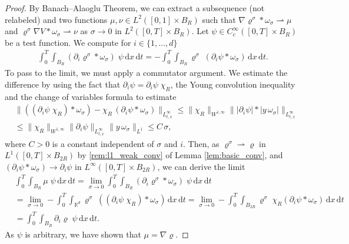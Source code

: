 \documentclass[reqno, 11pt]{amsart}
\numberwithin{equation}{section}
\theoremstyle{definition}
\begin{document}
\begin{proof}
    By Banach--Alaoglu Theorem, we can extract a subsequence (not relabeled) and two functions $\mu,\nu\in L^2([0,1]\times B_R)$ such that $\nabla\varrho^\sigma\ast\omega_\sigma \rightharpoonup \mu$ and $\varrho^\sigma\nabla V\ast\omega_\sigma \rightharpoonup \nu$ as $\sigma\rightarrow 0$ in $L^2([0,T]\times B_R)$. Let $\psi\in C_c^\infty([0,T]\times B_R)$ be a test function. We compute for $i\in \{1,\ldots,d\}$
    \begin{align*}
        \int_0^T \int_{B_R}
        (\partial_i \varrho^\sigma\ast\omega_\sigma)\;\psi\,\mathrm{d} x\,\mathrm{d} t
        =-\int_0^T \int_{B_R}
        \varrho^\sigma \; (\partial_i \psi\ast\omega_\sigma)\,\mathrm{d} x\,\mathrm{d} t.
    \end{align*}
    To pass to the limit, we must apply a commutator argument. We estimate the difference by using the fact that $\partial_i\psi=\partial_i\psi\;\chi_R$, the Young convolution inequality and the change of variables formula to estimate
    \begin{align*}
        &\|((\partial_i \psi\;\chi_R)\ast\omega_\sigma)-\chi_R\, (\partial_i \psi\ast\omega_\sigma)\|_{L_{t,x}^\infty}
        \leq \|\chi_R\|_{W^{1,\infty}}\||\partial_i \psi|\ast |y\,\omega_\sigma|\|_{L_{t,x}^\infty}\\
        &\leq \|\chi_R\|_{W^{1,\infty}}\|\partial_i \psi\|_{L_{t,x}^\infty}\|y\,\omega_\sigma\|_{L^1}
        \leq C\,\sigma,
    \end{align*}
    where $C>0$ is a constant independent of $\sigma$ and $i$. Then, as $\varrho^\sigma\rightharpoonup \varrho$ in $L^1([0,T]\times B_{2R})$ by \ref{rem:l1_weak_conv} of Lemma \ref{lem:basic_conv}, and $(\partial_i \psi\ast\omega_\sigma)\rightarrow \partial_i \psi$ in $L^\infty([0,T]\times B_{2R})$, we can derive the limit
    \begin{align*}
        &\int_0^T \int_{B_R}
        \mu\;\psi\,\mathrm{d} x\,\mathrm{d} t
        =\lim_{\sigma\rightarrow 0}\int_0^T \int_{B_R}
        (\partial_i \varrho^\sigma\ast\omega_\sigma)\;\psi\,\mathrm{d} x\,\mathrm{d} t\\
        &=\lim_{\sigma\rightarrow 0}-\int_0^T \int_{\mathbb{R}^{d}}
        \varrho^\sigma \; ((\partial_i \psi\;\chi_R)\ast\omega_\sigma)\,\mathrm{d} x\,\mathrm{d} t
        =\lim_{\sigma\rightarrow 0}-\int_0^T \int_{B_{2R}}
        \varrho^\sigma \; \chi_R(\partial_i \psi\ast\omega_\sigma)\,\mathrm{d} x\,\mathrm{d} t\\
        &=\int_0^T \int_{B_R}
        \partial_i \varrho\;\psi\,\mathrm{d} x\,\mathrm{d} t.
    \end{align*}
    As $\psi$ is arbitrary, we have shown that $\mu=\nabla \varrho$.
    

\end{proof}
\end{document}
